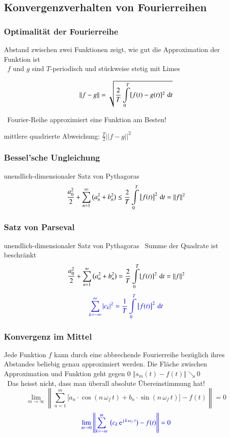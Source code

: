 \subsection{Konvergenzverhalten von Fourierreihen}

\subsubsection{Optimalität der Fourierreihe}

Abstand zwischen zwei Funktionen zeigt, wie gut die Approximation der Funktion ist \\
\textrightarrow\ $f$ und $g$ sind $T$-periodisch und stückweise stetig mit Limes

$$ \left\| f - g \right\| = \sqrt{\frac{2}{T} \int \limits_0^T  [f(t) - g(t)]^2 \, \mathop{} \! \mathrm{d} t } $$

\textrightarrow\ Fourier-Reihe approximiert eine Funktion am Besten! \smallskip

mittlere quadrierte Abweichung: $\frac{T}{2} \vert \vert f - g \vert \vert ^2$


\subsubsection{Bessel'sche Ungleichung}

unendlich-dimensionaler Satz von Pythagoras
$$ \frac{a_0^2}{2} + \sum \limits_{n=1}^\infty \big( a_n^2 + b_n^2 \big) \leq  \frac{2}{T} \int \limits_0^T \big[f(t) \big]^2 \, \mathop{} \! \mathrm{d} t = \Vert f \Vert ^2 $$


\subsubsection{Satz von Parseval}

unendlich-dimensionaler Satz von Pythagoras \textrightarrow\ Summe der Quadrate ist beschränkt
$$ \frac{a_0^2}{2} + \sum \limits_{n=1}^\infty \big( a_n^2 + b_n^2 \big) = \frac{2}{T} \int \limits_0^T [f(t)]^2 \, \mathop{} \! \mathrm{d} t = \left\| f \right\|^2 $$
$$ {\color{blue} \sum \limits_{k= -\infty}^\infty \vert c_k \vert ^2 = \frac{1}{T} \int \limits_0^T \big[ f(t) \big]^2 \, \mathop{} \! \mathrm{d} t } $$


\subsubsection{Konvergenz im Mittel}

Jede Funktion $f$ kann durch eine abbrechende Fourierreihe bezüglich ihres Abstandes beliebig genau approximiert werden.
Die Fläche zwischen Approximation und Funktion geht gegen 0 \quad $\Vert s_m(t) - f(t) \Vert \searrow 0$ \\
\textrightarrow\ Das heisst nicht, dass man überall absolute Übereinstimmung hat!
$$ \lim \limits_{m \to \infty} \left\|\sum\limits _{n=1}^m \big[ a_n \cdot \cos(n \, \omega_f \, t) + b_n \cdot \sin(n \, \omega_f \, t) \big] - f(t) \right\| = 0 $$
$$ \cbl{\lim \limits_{m \to 0} \left\| \sum\limits _{k= -m}^m \: \big( c_k \, \e^{ \jimg \, k \, \omega_f \, t} \big) - f(t) \right\| = 0} $$


